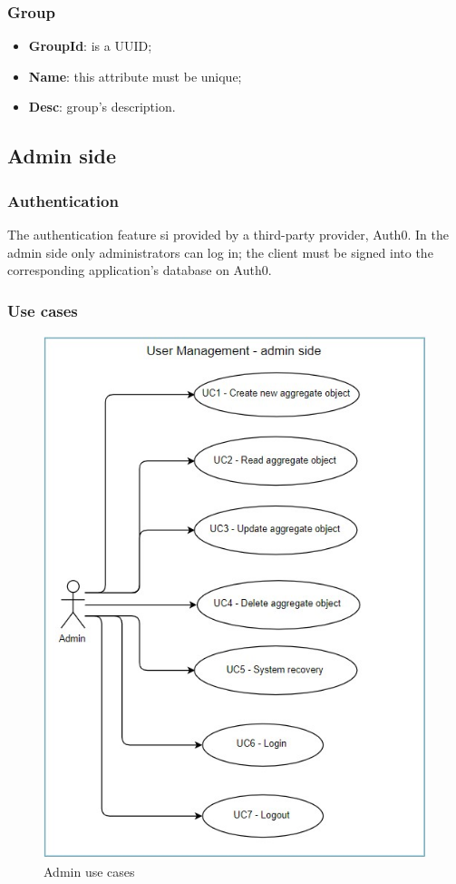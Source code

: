 \subsubsection{Group}
\begin{itemize}
	\item \textbf{GroupId}: is a UUID;
	\item \textbf{Name}: this attribute must be unique;
	\item \textbf{Desc}: group's description.
\end{itemize}

\subsection{Admin side}
\subsubsection{Authentication}
The authentication feature si provided by a third-party provider, Auth0. In the admin side only administrators can log in; the client must be signed into the corresponding application's database on Auth0.
\subsubsection{Use cases}

\begin{figure} [H]
	\centering
	\includegraphics[scale=1.2]{../Img/UC_admin}
	\caption{Admin use cases}\label{}
\end{figure}


